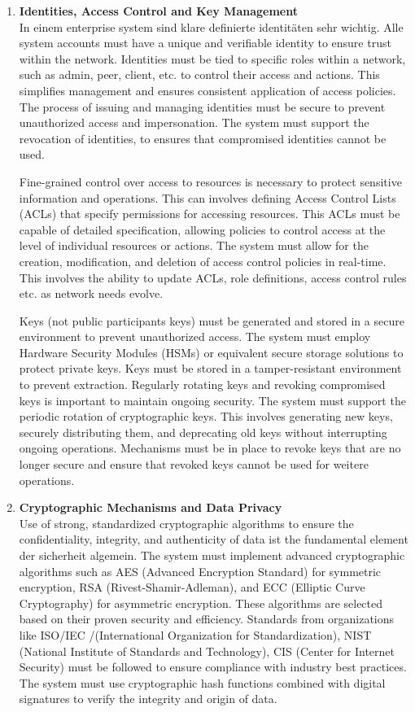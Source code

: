 \begin{enumerate}[label=\textbullet]
	\item\textbf{Identities, Access Control and Key Management}\\
    In einem enterprise system sind klare definierte identitäten sehr wichtig. Alle system accounts must have a unique and verifiable identity to ensure trust within the network. Identities must be tied to specific roles within a network, such as admin, peer, client, etc. to control their access and actions. This simplifies management and ensures consistent application of access policies. The process of issuing and managing identities must be secure to prevent unauthorized access and impersonation. The system must support the revocation of identities, to ensures that compromised identities cannot be used. 
	
	Fine-grained control over access to resources is necessary to protect sensitive information and operations.
	This can involves defining Access Control Lists (ACLs) that specify permissions for accessing resources. This ACLs must be capable of detailed specification, allowing policies to control access at the level of individual resources or actions.
	The system must allow for the creation, modification, and deletion of access control policies in real-time. This involves the ability to update ACLs, role definitions, access control rules etc. as network needs evolve. 
	
	Keys (not public participants keys) must be generated and stored in a secure environment to prevent unauthorized access. The system must employ Hardware Security Modules (HSMs) or equivalent secure storage solutions to protect private keys. Keys must be stored in a tamper-resistant environment to prevent extraction. Regularly rotating keys and revoking compromised keys is important to maintain ongoing security. The system must support the periodic rotation of cryptographic keys. This involves generating new keys, securely distributing them, and deprecating old keys without interrupting ongoing operations. Mechanisms must be in place to revoke keys that are no longer secure and ensure that revoked keys cannot be used for weitere operations.

	\item\textbf{Cryptographic Mechanisms and Data Privacy}\\
	Use of strong, standardized cryptographic algorithms to ensure the confidentiality, integrity, and authenticity of data ist the fundamental element der sicherheit algemein. The system must implement advanced cryptographic algorithms such as AES (Advanced Encryption Standard) for symmetric encryption, RSA (Rivest-Shamir-Adleman), and ECC (Elliptic Curve Cryptography) for asymmetric encryption. These algorithms are selected based on their proven security and efficiency. Standards from organizations like ISO/IEC /(International Organization for Standardization), NIST (National Institute of Standards and Technology), CIS (Center for Internet Security) must be followed to ensure compliance with industry best practices. The system must use cryptographic hash functions combined with digital signatures to verify the integrity and origin of data.


\end{enumerate}
